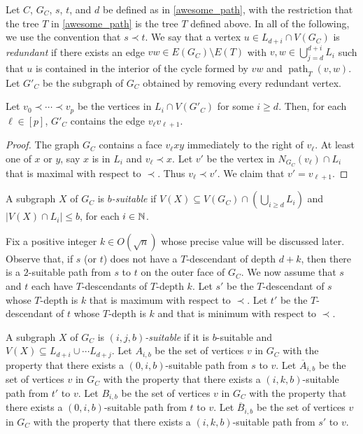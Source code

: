 \documentclass{patmorin}
\newcommand{\defin}[1]{\emph{\textcolor{brightmaroon}{#1}}}
\DeclareMathOperator{\pth}{path}
\begin{document}
Let $C$, $G_C$, $s$, $t$, and $d$ be defined as in \cref{awesome_path}, with the restriction that the tree $T$ in \cref{awesome_path} is the tree $T$ defined above.  In all of the following, we use the convention that $s\prec t$.  We say that a vertex $u\in L_{d+i}\cap V(G_C)$ is \defin{redundant} if there exists an edge $vw\in E(G_C)\setminus E(T)$ with $v,w\in\bigcup_{j=d}^{d+i} L_i$ such that $u$ is contained in the interior of the cycle formed by $vw$ and $\pth_T(v,w)$.  Let $G'_C$ be the subgraph of $G_C$ obtained by removing every redundant vertex.

\begin{clm}
  Let $v_0\prec\cdots\prec v_{p}$ be the vertices in $L_i\cap V(G'_C)$ for some $i\ge d$.  Then, for each $\ell\in[p]$, $G'_C$ contains the edge $v_\ell v_{\ell+1}$.
\end{clm}

\begin{proof}
  The graph $G_C$ contains a face $v_\ell xy$ immediately to the right of $v_\ell$.  At least one of $x$ or $y$, say $x$ is in $L_i$ and $v_\ell\prec x$.  Let $v'$ be the vertex in $N_{G_C}(v_\ell)\cap L_i$ that is maximal with respect to $\prec$.  Thus $v_\ell\prec v'$.  We claim that $v'=v_{\ell+1}$.
\end{proof}








A subgraph $X$ of $G_C$ is \defin{$b$-suitable} if $V(X)\subseteq V(G_C)\cap(\bigcup_{i\ge d} L_i)$ and $|V(X)\cap L_i|\le b$, for each $i\in\mathbb{N}$.




 Fix a positive integer $k\in O(\sqrt{n})$ whose precise value will be discussed later.  Observe that, if $s$ (or $t$) does not have a $T$-descendant of depth $d+k$, then there is a $2$-suitable path from $s$ to $t$ on the outer face of $G_C$.  We now assume that $s$ and $t$ each have $T$-descendants of $T$-depth $k$. Let $s'$ be the $T$-descendant of $s$ whose $T$-depth is $k$ that is maximum with respect to $\prec$.  Let $t'$ be the $T$-descendant of $t$ whose $T$-depth is $k$ and that is minimum with respect to $\prec$.

A subgraph $X$ of $G_C$ is \defin{$(i,j,b)$-suitable} if it is $b$-suitable and $V(X)\subseteq L_{d+i}\cup\cdots L_{d+j}$.
Let $A_{i,b}$ be the set of vertices $v$ in $G_{C}$ with the property that there exists a $(0,i,b)$-suitable path from $s$ to $v$.  Let $\overline{A}_{i,b}$ be the set of vertices $v$ in $G_{C}$ with the property that there exists a $(i,k,b)$-suitable path from $t'$ to $v$.
Let $B_{i,b}$ be the set of vertices $v$ in $G_{C}$ with the property that there exists a $(0,i,b)$-suitable path from $t$ to $v$.  Let $\overline{B}_{i,b}$ be the set of vertices $v$ in $G_{C}$ with the property that there exists a $(i,k,b)$-suitable path from $s'$ to $v$.
\end{document}

